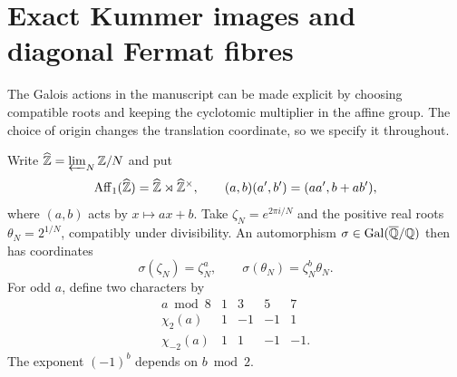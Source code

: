 \section{Exact Kummer images and diagonal Fermat fibres}\label{sec:kummer}
The Galois actions in the manuscript can be made explicit by choosing
compatible roots and keeping the cyclotomic multiplier in the affine
group. The choice of origin changes the translation coordinate, so
we specify it throughout.

Write $\widehat{\mathbb Z}=\varprojlim_N\mathbb Z/N$ and put
\[
 \operatorname{Aff}_1(\widehat{\mathbb Z})
 =\widehat{\mathbb Z}\rtimes\widehat{\mathbb Z}^\times,
 \qquad (a,b)(a',b')=(aa',b+ab'),
\]
where $(a,b)$ acts by $x\mapsto ax+b$. Take
$\zeta_N=e^{2\pi i/N}$ and the positive real roots
$\theta_N=2^{1/N}$, compatibly under divisibility. An automorphism
$\sigma\in\operatorname{Gal}(\overline{\mathbb Q}/\mathbb Q)$ then has coordinates
\[
 \sigma(\zeta_N)=\zeta_N^a,\qquad
 \sigma(\theta_N)=\zeta_N^b\theta_N.
\]
For odd $a$, define two characters by
\[
\begin{array}{c|rrrr}
 a\bmod8&1&3&5&7\\\hline
 \chi_2(a)&1&-1&-1&1\\
 \chi_{-2}(a)&1&1&-1&-1.
\end{array}
\]
The exponent $(-1)^b$ depends on $b\bmod2$.

